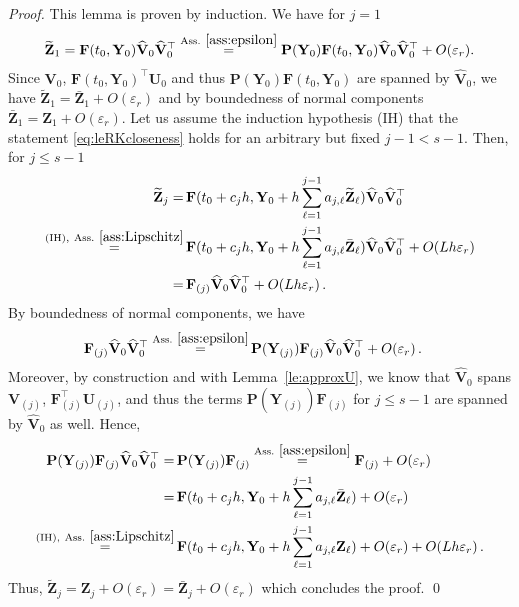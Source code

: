 \documentclass[preprint,runningheads]{svjour3}
\newcommand\bfF{{\mathbf F}}
\newcommand\bfP{{\mathbf P}}
\newcommand\bfU{{\mathbf U}}
\newcommand\bfV{{\mathbf V}}
\newcommand\bfY{{\mathbf Y}}
\newcommand\bfZ{{\mathbf Z}}
\begin{document}
\begin{proof}
This lemma is proven by induction. We have for $j=1$
\begin{align*}
    \widetilde \bfZ_1 = \bfF(t_0, \bfY_0)\widehat \bfV_0\widehat \bfV_0^{\top} \stackrel{\mathrm{Ass.}~\ref{ass:epsilon}}{=} \bfP(\bfY_0)\bfF(t_0, \bfY_0)\widehat \bfV_0\widehat \bfV_0^{\top} + O(\varepsilon_r).
\end{align*}
Since $\bfV_0$, $\bfF(t_0, \bfY_0)^{\top}\bfU_0$ and thus $\bfP(\bfY_0)\bfF(t_0, \bfY_0)$ are spanned by $\widehat \bfV_0$, we have $\widetilde \bfZ_1 = \bar \bfZ_1 + O(\varepsilon_r)$ and by boundedness of normal components $\bar \bfZ_1 = \bfZ_1 + O(\varepsilon_r)$.
Let us assume the induction hypothesis (IH) that the statement \eqref{eq:leRKcloseness} holds for an arbitrary but fixed $j-1 < s-1$. Then, for $j \leq s-1$
    \begin{align*}
        \widetilde \bfZ_j =\,& \bfF(t_0 + c_j h, \bfY_0 + h\sum_{\ell = 1}^{j-1}a_{j,\ell}\widetilde \bfZ_{\ell})\widehat \bfV_0\widehat \bfV_0^{\top}\\
        \stackrel{\mathrm{(IH),~\mathrm{ Ass.}~\ref{ass:Lipschitz}}}{=}\,& \bfF(t_0 + c_j h, \bfY_0 + h\sum_{\ell = 1}^{j-1}a_{j,\ell}\bar \bfZ_{\ell})\widehat \bfV_0\widehat \bfV_0^{\top} + O(Lh\varepsilon_r)\\
        =\,& \bfF_{(j)}\widehat \bfV_0\widehat \bfV_0^{\top} + O(Lh\varepsilon_r)\,.
    \end{align*}
    By boundedness of normal components, we have
    \begin{align*}
        \bfF_{(j)}\widehat \bfV_0\widehat \bfV_0^{\top} \stackrel{\text{Ass.}~\ref{ass:epsilon}}{=}\,&\bfP(\bfY_{(j)})\bfF_{(j)}\widehat \bfV_0\widehat \bfV_0^{\top} + O(\varepsilon_r)\,.
    \end{align*}    
    Moreover, by construction and with Lemma~\ref{le:approxU}, we know that $\widehat \bfV_0$ spans $\bfV_{(j)}$, $\bfF_{(j)}^{\top}\bfU_{(j)}$, and thus the terms $\bfP(\bfY_{(j)})\bfF_{(j)}$ for $j\leq s-1$ are spanned by $\widehat \bfV_0$ as well. Hence, 
    \begin{align*}
        \bfP(\bfY_{(j)})\bfF_{(j)}\widehat \bfV_0\widehat \bfV_0^{\top} =\,& \bfP(\bfY_{(j)})\bfF_{(j)} \stackrel{\text{Ass.}~\ref{ass:epsilon}}{=} \bfF_{(j)} + O(\varepsilon_r)\\
        =\,& \bfF(t_0 + c_j h, \bfY_0 + h\sum_{\ell = 1}^{j-1}a_{j,\ell} \bar \bfZ_{\ell}) + O(\varepsilon_r)\\
        \stackrel{\mathrm{(IH),~\mathrm{ Ass.}~\ref{ass:Lipschitz}}}{=}\,& \bfF(t_0 + c_j h, \bfY_0 + h\sum_{\ell = 1}^{j-1}a_{j,\ell} \bfZ_{\ell}) + O(\varepsilon_r) + O(Lh\varepsilon_r)\,.
    \end{align*}
    Thus, $\widetilde \bfZ_j = \bfZ_j + O(\varepsilon_r) = \bar\bfZ_j + O(\varepsilon_r)$ which concludes the proof. \qed
\end{proof}
\end{document}
